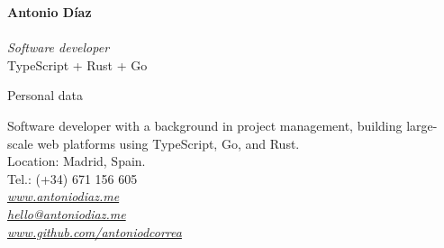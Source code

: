 \documentclass[11pt,a4paper]{article}
\begin{document}
\begin{cv}
  {\fontsize{18pt}{22pt}\selectfont
  {\bfseries\sc\huge{Antonio Díaz}}\\\\
  {\mdseries\it\normalsize{Software developer}}\\
  {\sc\mdseries\normalsize{TypeScript + Rust + Go}}
  }
  \vspace{1em}
  \begin{cvlist}{Personal data}
    \item[~]
    Software developer with a background in project management, building large-scale web platforms using TypeScript, Go, and Rust.\\
    Location: Madrid, Spain.\\
    Tel.: (+34) 671 156 605\\
    {\href{https://antoniodiaz.me}{\textit{www.antoniodiaz.me}}}\\
    {\href{mailto:hello@antoniodiaz.me?subject=Hello!&body=...}{\textit{hello@antoniodiaz.me}}}\\
    {\href{https://www.github.com/antoniodcorrea}{\textit{www.github.com/antoniodcorrea}}}
  \end{cvlist}
  \AddToShipoutPicture*


\end{cv}
\end{document}
